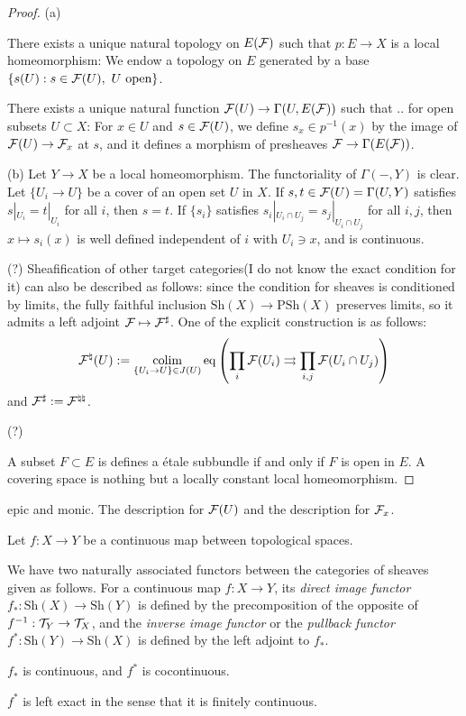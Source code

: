 \documentclass{../../large}
\newcommand{\PSh}{\mathrm{PSh}}
\newcommand{\Sh}{\mathrm{Sh}}
\begin{document}
\begin{proof}
(a)

There exists a unique natural topology on $E(\mathcal{F})$ such that $p:E\to X$ is a local homeomorphism:
We endow a topology on $E$ generated by a base $\{s(U):s\in\cF(U),\ U\text{ open}\}$.

There exists a unique natural function $\mathcal{F}(U)\to\Gamma(U,E(\mathcal{F}))$ such that .. for open subsets $U\subset X$:
For $x\in U$ and $s\in\mathcal{F}(U)$, we define $s_x\in p^{-1}(x)$ by the image of $\mathcal{F}(U)\to\mathcal{F}_x$ at $s$, and it defines a morphism of presheaves $\mathcal{F}\to\Gamma(E(\mathcal{F}))$.

(b)
Let $Y\to X$ be a local homeomorphism.
The functoriality of $\Gamma(-,Y)$ is clear.
Let $\{U_i\to U\}$ be a cover of an open set $U$ in $X$.
If $s,t\in\mathcal{F}(U)=\Gamma(U,Y)$ satisfies $s|_{U_i}=t|_{U_i}$ for all $i$, then $s=t$.
If $\{s_i\}$ satisfies $s_i|_{U_i\cap U_j}=s_j|_{U_i\cap U_j}$ for all $i,j$, then $x\mapsto s_i(x)$ is well defined independent of $i$ with $U_i\ni x$, and is continuous.


(?)
Sheafification of other target categories(I do not know the exact condition for it) can also be described as follows:
since the condition for sheaves is conditioned by limits, the fully faithful inclusion $\Sh(X)\to\PSh(X)$ preserves limits, so it admits a left adjoint $\mathcal{F}\mapsto\mathcal{F}^\sharp$.
One of the explicit construction is as follows:
\[\mathcal{F}^\natural(U):=\operatorname*{colim}_{\{U_i\to U\}\in J(U)}\mathrm{eq}\left(\prod_i\mathcal{F}(U_i)\rightrightarrows\prod_{i,j}\mathcal{F}(U_i\cap U_j)\right)\]
and $\mathcal{F}^\sharp:=\mathcal{F}^{\natural\natural}$.



(?)

A subset $F\subset E$ is defines a \'etale subbundle if and only if $F$ is open in $E$.
A covering space is nothing but a locally constant local homeomorphism.


\end{proof}

\begin{prb}
epic and monic.
The description for $\mathcal{F}(U)$ and the description for $\mathcal{F}_x$.

Let $f:X\to Y$ be a continuous map between topological spaces.
\end{prb}

\begin{prb}
We have two naturally associated functors between the categories of sheaves given as follows.
For a continuous map $f:X\to Y$, its \emph{direct image functor} $f_*:\Sh(X)\to\Sh(Y)$ is defined by the precomposition of the opposite of $f^{-1}:\mathcal{T}_Y\to\mathcal{T}_X$, and the \emph{inverse image functor} or the \emph{pullback functor} $f^*:\Sh(Y)\to\Sh(X)$ is defined by the left adjoint to $f_*$.

\begin{parts}
\item $f_*$ is continuous, and $f^*$ is cocontinuous.
\item $f^*$ is left exact in the sense that it is finitely continuous.
\end{parts}
\end{prb}
\end{document}
